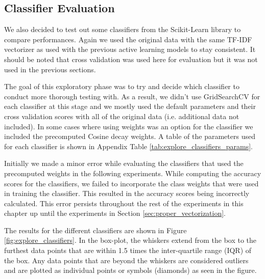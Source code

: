 \subsection{Classifier Evaluation}

We also decided to test out some classifiers from the Scikit-Learn library to compare performances. Again we used the original data with the same TF-IDF vectorizer as used with the previous active learning models to stay consistent. It should be noted that cross validation was used here for evaluation but it was not used in the previous sections.

The goal of this exploratory phase was to try and decide which classifier to conduct more thorough testing with. As a result, we didn't use GridSearchCV for each classifier at this stage and we mostly used the default parameters and their cross validation scores with all of the original data (i.e. additional data not included). In some cases where using weights was an option for the classifier we included the precomputed Cosine decay weights. A table of the parameters used for each classifier is shown in Appendix Table \ref{tab:explore_classifiers_params}.

Initially we made a minor error while evaluating the classifiers that used the precomputed weights in the following experiments. While computing the accuracy scores for the classifiers, we failed to incorporate the class weights that were used in training the classifier. This resulted in the accuracy scores being incorrectly calculated. This error persists throughout the rest of the experiments in this chapter up until the experiments in Section \ref{sec:proper_vectorization}.

The results for the different classifiers are shown in Figure \ref{fig:explore_classifiers}. In the box-plot, the whiskers extend from the box to the furthest data points that are within 1.5 times the inter-quartile range (IQR) of the box. Any data points that are beyond the whiskers are considered outliers and are plotted as individual points or symbols (diamonds) as seen in the figure.


